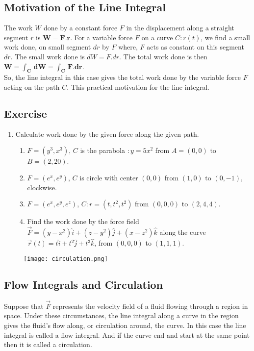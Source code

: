 \documentclass[aima331_lecturenotes_ku.tex]{subfiles}
\begin{document}
\subsection{Motivation of the Line Integral}
The work $W$ done by a constant force $F$ in the displacement along a straight segment $r$ is $\mathbf{W=F.r}$. For a variable force $F$ on a curve $C:r(t)$, we find a small work done, on small segment $dr$ by $F$ where, $F$ acts as constant on this segment $dr$. The small work done is $dW=F.dr$. The total work done is then $\mathbf{W=\int_C\, dW= \int_C \, F.dr}$. \\
So, the line integral in this case gives the total work done by the variable force $F$ acting on the path $C$. This practical motivation for the line integral.

\subsection{Exercise}
\begin{enumerate}
\item Calculate work done by the given force along the given path.
  \begin{enumerate}
  \item $F=(y^3, x^3)$,  $C$ is the parabola $:y=5x^2$ from $A=(0,0)$ to $B=(2,20)$.
  \item $F=(e^x, e^y)$, $C$ is circle with center $(0,0)$ from $(1,0)$ to $(0,-1)$, clockwise.
  \item $F=(e^x, e^y, e^z)$, $C:r=(t, t^2, t^2)$ from $(0,0,0)$ to $(2,4,4)$.
   \item Find the work done by the force field $\vec{F} = (y-x^2)\hat{i} + (z-y^2)\hat{j} + (x-z^2)\hat{k}$ along the curve $\vec{r}(t) = t\hat{i} + t^2\hat{j} + t^3\hat{k}$, from $(0,0,0)$ to $(1,1,1)$.
  \end{enumerate}
\end{enumerate}

\begin{figure}[h]
  \centering
  \texttt{[image: circulation.png]}
\end{figure}

\subsection{Flow Integrals and Circulation}
Suppose that $\vec{F}$ represents the velocity field of a fluid flowing through a region in space. Under these circumstances, the line integral along a curve in the region gives the fluid's flow along, or circulation around, the curve. In this case the line integral is called a flow integral. And if the curve end and start at the same point then it is called a circulation.
\end{document}
